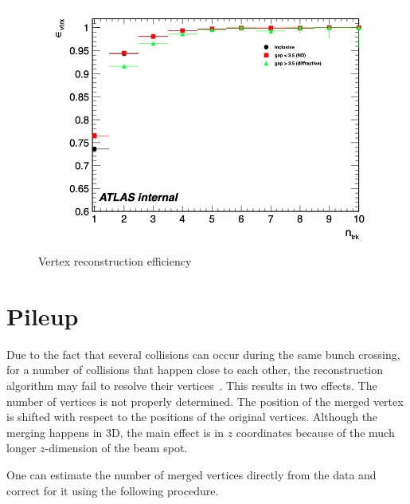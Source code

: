 \begin{figure}
    \centering
    \includegraphics[width=0.5\linewidth]{images/vrtx_eff.png}
    \caption{Vertex reconstruction efficiency}
    \label{fig:vrtx_eff}
\end{figure}







\section{Pileup}
\label{sec:vertex_merging}

Due to the fact that several collisions can occur during the same bunch crossing, for a number of collisions that happen close to each other, the reconstruction algorithm may fail to resolve their vertices~\cite{ATLAS:2016nnj}. This results in two effects. The number of vertices is not properly determined. The position of the merged vertex is shifted with respect to the positions of the original vertices. Although the merging happens in 3D, the main effect is in $z$ coordinates because of the much longer $z$-dimension of the beam spot. 

One can estimate the number of merged vertices directly from the data and correct for it using the following procedure. 

